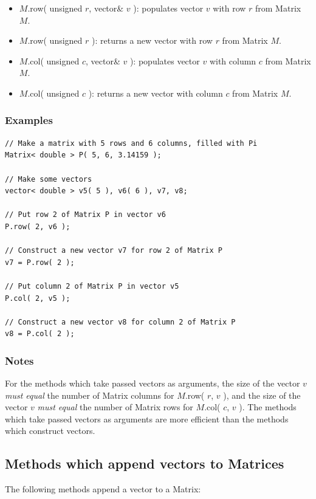 \documentclass{report}
\begin{document}
\begin{itemize}
\item $M$.row( unsigned $r$, vector\& $v$ ): populates vector $v$ with
      row $r$ from Matrix $M$.
\item $M$.row( unsigned $r$ ): returns a new vector with row $r$ from
      Matrix $M$.
\item $M$.col( unsigned $c$, vector\& $v$ ): populates vector $v$ with
      column $c$ from Matrix $M$.
\item $M$.col( unsigned $c$ ): returns a new vector with column $c$
      from Matrix $M$.
\end{itemize}

\subsubsection{Examples}

\begin{verbatim}
// Make a matrix with 5 rows and 6 columns, filled with Pi
Matrix< double > P( 5, 6, 3.14159 );

// Make some vectors
vector< double > v5( 5 ), v6( 6 ), v7, v8;

// Put row 2 of Matrix P in vector v6
P.row( 2, v6 );

// Construct a new vector v7 for row 2 of Matrix P
v7 = P.row( 2 );

// Put column 2 of Matrix P in vector v5
P.col( 2, v5 );

// Construct a new vector v8 for column 2 of Matrix P
v8 = P.col( 2 );
\end{verbatim}

\subsubsection{Notes}
For the methods which take passed vectors as arguments, the size of
the vector $v$ {\em must equal} the number of Matrix columns for
$M$.row( $r$, $v$ ), and the size of the vector $v$ {\em must equal}
the number of Matrix rows for $M$.col( $c$, $v$ ).  The methods which
take passed vectors as arguments are more efficient than the methods
which construct vectors.

\subsection{Methods which append vectors to Matrices}

The following methods append a vector to a Matrix:
\end{document}
